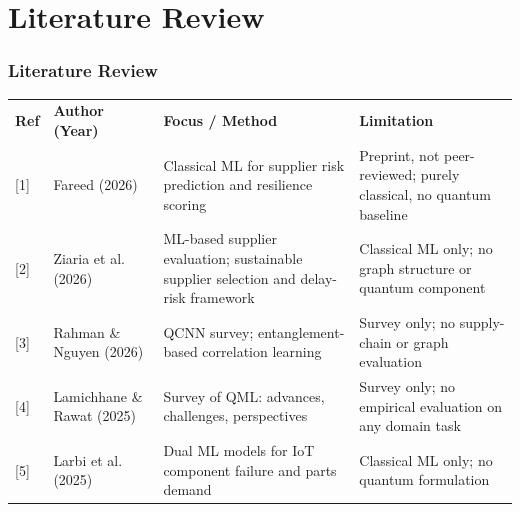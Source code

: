 \documentclass{beamer}
\newcommand{\tabfont}{\scriptsize}
\newcommand{\rowgap}{\addlinespace[4pt]}
\begin{document}
\section{Literature Review}
\begin{frame}[t,shrink=12]
\frametitle{Literature Review}
\tabfont
\centering
\begin{tabularx}{\linewidth}{@{}>{\raggedright\arraybackslash}p{0.6cm}
                               >{\raggedright\arraybackslash}p{2.2cm}
                               >{\raggedright\arraybackslash}X
                               >{\raggedright\arraybackslash}X@{}}
\multicolumn{4}{@{}c@{}}{\textbf{Table 1: Literature Survey}} \\
\toprule
\textbf{Ref} & \textbf{Author (Year)} & \textbf{Focus / Method} & \textbf{Limitation} \\
\midrule
{[1]} & Fareed (2026) &
Classical ML for supplier risk prediction and resilience scoring &
Preprint, not peer-reviewed; purely classical, no quantum baseline \\ \rowgap

[2] & Ziaria et al. (2026) &
ML-based supplier evaluation; sustainable supplier selection and delay-risk framework &
Classical ML only; no graph structure or quantum component \\ \rowgap

[3] & Rahman \& Nguyen (2026) &
QCNN survey; entanglement-based correlation learning &
Survey only; no supply-chain or graph evaluation \\ \rowgap

[4] & Lamichhane \& Rawat (2025) &
Survey of QML: advances, challenges, perspectives &
Survey only; no empirical evaluation on any domain task \\ \rowgap

[5] & Larbi et al. (2025) &
Dual ML models for IoT component failure and parts demand &
Classical ML only; no quantum formulation \\
\bottomrule
\end{tabularx}
\end{frame}
\end{document}
